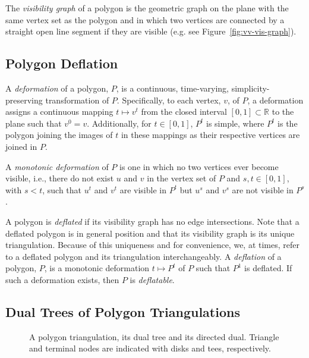 \documentclass{amsart}
\newcommand{\R}[0]{\mathds{R}}
\begin{document}
The \emph{visibility graph} of a polygon is the geometric graph on the
plane with the same vertex set as the polygon and in which two
vertices are connected by a straight open line segment if they are
visible (e.g. see Figure~\ref{fig:vv-vis-graph}).


\subsection{Polygon Deflation}

A \emph{deformation} of a polygon, $P$, is a continuous, time-varying,
simplicity-preserving transformation of $P$.  Specifically, to each
vertex, $v$, of $P$, a deformation assigns a continuous mapping
$t\mapsto v^t$ from the closed interval $[0,1]\subset\R$ to the plane
such that $v^0 = v$.  Additionally, for $t\in[0,1]$, $P^t$ is simple,
where $P^t$ is the polygon joining the images of $t$ in these mappings
as their respective vertices are joined in $P$.

A \emph{monotonic deformation} of $P$ is one in which no two vertices
ever become visible, i.e., there do not exist $u$ and $v$ in the
vertex set of $P$ and $s, t\in [0, 1]$, with $s < t$, such that $u^t$
and $v^t$ are visible in $P^t$ but $u^s$ and $v^s$ are not visible in
$P^s$.


A polygon is \emph{deflated} if its visibility graph has no edge
intersections.  Note that a deflated polygon is in general position
and that its visibility graph is its unique triangulation.  Because of
this uniqueness and for convenience, we, at times, refer to a deflated
polygon and its triangulation interchangeably.  A \emph{deflation} of
a polygon, $P$, is a monotonic deformation $t\mapsto P^t$ of $P$ such
that $P^1$ is deflated.  If such a deformation exists, then $P$ is
\emph{deflatable}.


\subsection{Dual Trees of Polygon Triangulations}

\begin{figure}[htb]
  \centering
  \quad
  \quad
  \caption{\protect{} A polygon
    triangulation, \protect{} its dual tree
    and \protect{} its directed dual.  Triangle
    and terminal nodes are indicated with disks and tees,
    respectively.}
  \label{fig:pt-dt-dd}
\end{figure}
\end{document}
